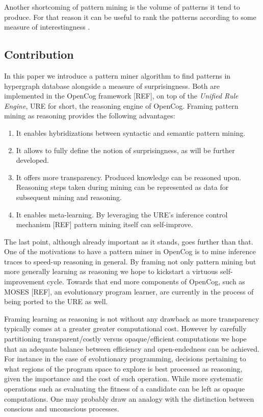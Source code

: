 \documentclass[runningheads]{llncs}
\begin{document}
Another shortcoming of pattern mining is the volume of patterns it
tend to produce. For that reason it can be useful to rank the patterns
according to some measure of interestingness \cite{Vreeken2014}.

\subsection{Contribution}

In this paper we introduce a pattern miner algorithm to find patterns
in hypergraph database alongside a measure of surprisingness. Both are
implemented in the OpenCog framework [REF], on top of the
\emph{Unified Rule Engine}, URE for short, the reasoning engine of
OpenCog. Framing pattern mining as reasoning provides the following
advantages:
\begin{enumerate}
\item It enables hybridizations between syntactic and semantic pattern
  mining.
\item It allows to fully define the notion of surprisingness, as will
  be further developed.
\item It offers more transparency. Produced knowledge can be reasoned
  upon. Reasoning steps taken during mining can be represented as data
  for subsequent mining and reasoning.
\item It enables meta-learning. By leveraging the URE's inference
  control mechanism [REF] pattern mining itself can self-improve.
\end{enumerate}
The last point, although already important as it stands, goes further
than that. One of the motivations to have a pattern miner in OpenCog
is to mine inference traces to speed-up reasoning in general. By
framing not only pattern mining but more generally learning as
reasoning we hope to kickstart a virtuous self-improvement
cycle. Towards that end more components of OpenCog, such as MOSES
[REF], an evolutionary program learner, are currently in the process
of being ported to the URE as well.

Framing learning as reasoning is not without any drawback as more
transparency typically comes at a greater greater computational
cost. However by carefully partitioning transparent/costly versus
opaque/efficient computations we hope that an adequate balance between
efficiency and open-endedness can be achieved. For instance in the
case of evolutionary programming, decisions pertaining to what regions
of the program space to explore is best processed as reasoning, given
the importance and the cost of such operation. While more systematic
operations such as evaluating the fitness of a candidate can be left
as opaque computations. One may probably draw an analogy with the
distinction between conscious and unconscious processes.
\end{document}
